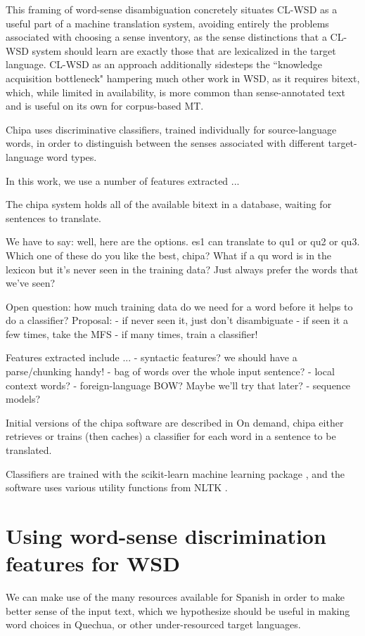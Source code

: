 \documentclass[10pt, a4paper]{article}
\begin{document}
This framing of word-sense disambiguation concretely situates CL-WSD as a
useful part of a machine translation system, avoiding entirely the problems
associated with choosing a sense inventory, as the sense distinctions that a
CL-WSD system should learn are exactly those that are lexicalized in the target
language. CL-WSD as an approach additionally sidesteps the ``knowledge
acquisition bottleneck"
\cite{agirre2006word}
hampering much other work in WSD, as it requires bitext, which, while limited
in availability, is more common than sense-annotated text and is useful on its
own for corpus-based MT.

Chipa uses discriminative classifiers, trained individually for source-language
words, in order to distinguish between the senses associated with different
target-language word types.

In this work, we use a number of features extracted ...

The chipa system holds all of the available bitext in a database, waiting for
sentences to translate.


We have to say: well, here are the options. es1 can translate to qu1 or qu2 or
qu3. Which one of these do you like the best, chipa?
What if a qu word is in the lexicon but it's never seen in the training data?
Just always prefer the words that we've seen?


Open question: how much training data do we need for a word before it helps to
do a classifier?
Proposal:
- if never seen it, just don't disambiguate
- if seen it a few times, take the MFS
- if many times, train a classifier!



Features extracted include ...
- syntactic features? we should have a parse/chunking handy!
- bag of words over the whole input sentence?
- local context words?
- foreign-language BOW? Maybe we'll try that later?
- sequence models?




Initial versions of the chipa software are described in
\cite{rudnick-gasser:2013:HyTra}
On demand, chipa either retrieves or trains (then caches) a classifier
for each word in a sentence to be translated.


Classifiers are trained with the scikit-learn machine learning package
\cite{scikit-learn}, and the software uses various utility functions from NLTK
\cite{nltkbook}.


\section{Using word-sense discrimination features for WSD}
We can make use of the many resources available for Spanish in order to make
better sense of the input text, which we hypothesize should be useful in making
word choices in Quechua, or other under-resourced target languages.
\end{document}
